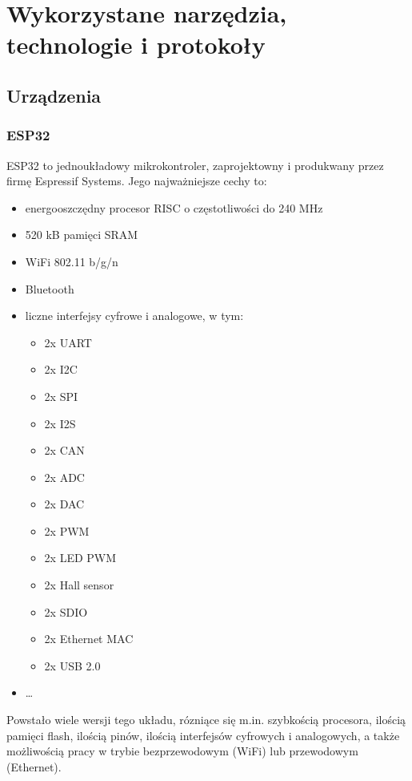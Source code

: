 
\chapter{Wykorzystane narzędzia, technologie i protokoły}

\section{Urządzenia}
\subsection{ESP32}
ESP32 to jednoukładowy mikrokontroler, zaprojektowny i produkwany przez firmę Espressif Systems. Jego najważniejsze cechy to:
\begin{itemize}
    \item energooszczędny procesor RISC o częstotliwości do 240 MHz
    \item 520 kB pamięci SRAM
    \item WiFi 802.11 b/g/n
    \item Bluetooth
    \item liczne interfejsy cyfrowe i analogowe, w tym:
          \begin{itemize}
              \item 2x UART
              \item 2x I2C
              \item 2x SPI
              \item 2x I2S
              \item 2x CAN
              \item 2x ADC
              \item 2x DAC
              \item 2x PWM
              \item 2x LED PWM
              \item 2x Hall sensor
              \item 2x SDIO
              \item 2x Ethernet MAC
              \item 2x USB 2.0
          \end{itemize}\cite{ESP32:datasheet}
    \item \dots
\end{itemize}
Powstało wiele wersji tego układu, rózniące się m.in. szybkością procesora, ilością pamięci flash, ilością pinów, ilością interfejsów cyfrowych i analogowych, a także możliwością pracy w trybie bezprzewodowym (WiFi) lub przewodowym (Ethernet)\cite{ESP32:socs}.
